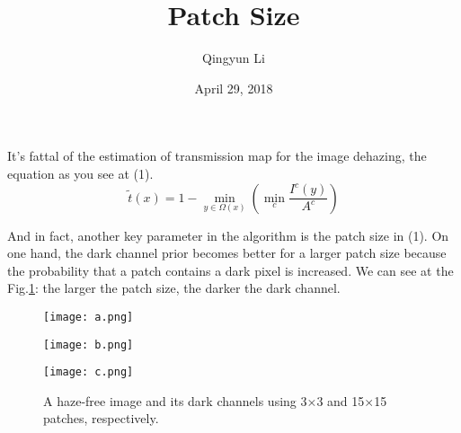 \documentclass{article}
\author{Qingyun Li}
\date{April 29, 2018}
\title{Patch Size}
\begin{document}
\maketitle
 \par It's fattal of the estimation of transmission map for the image dehazing, the equation as you see at (1).
 \begin{equation}
\tilde{t}(x)=1-\min\limits_{y\in\Omega(x)}(\min\limits_{c}\frac{I^{c}(y)}{A^c})
\end{equation}
\par And in fact, another key parameter in the algorithm is the patch size in (1). On one hand, the dark channel prior\cite{He2011Single} becomes better for a larger patch size because the probability that a patch contains a dark pixel is increased. We can see at the Fig.\ref{patch size}: the larger the patch size, the darker the dark channel.
\begin{figure}[htbp]
\begin{minipage}{0.3\linewidth}
\texttt{[image: a.png]}\\
\label{fig:side:a} 
\end{minipage}
\hfill
\begin{minipage}{0.3\linewidth}
\texttt{[image: b.png]}\\
\label{fig:side:b}
\end{minipage} 
\hfill
\begin{minipage}{0.3\linewidth}
\texttt{[image: c.png]}\\
\label{fig:side:c} 
\end{minipage}
\caption{A haze-free image and its dark channels using 3×3 and 15×15 patches, respectively.} \label{patch size}
\end{figure}


\end{document}
